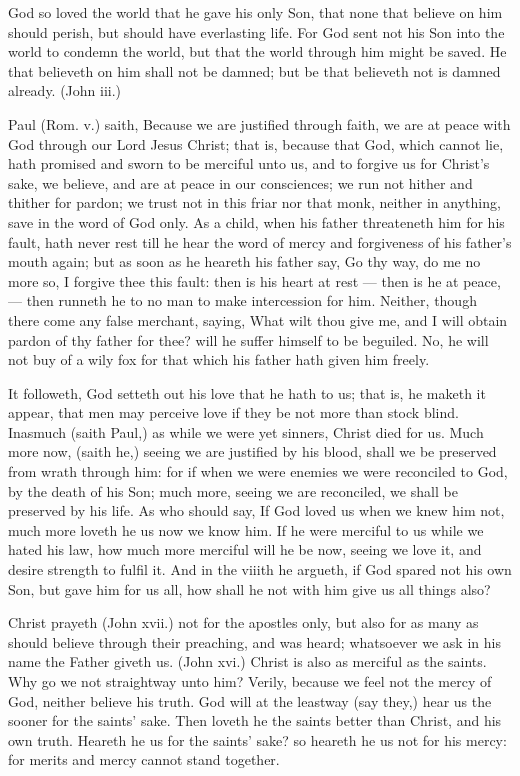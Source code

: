 God so loved the world that he gave his only Son, that 
none that believe on him should perish, but should have 
everlasting life. For God sent not his Son into the world 
to condemn the world, but that the world through him 
might be saved. He that believeth on him shall not be 
damned; but be that believeth not is damned already. 
(John iii.) 

Paul (Rom. v.) saith, Because we are justified through 
faith, we are at peace with God through our Lord Jesus 
Christ; that is, because that God, which cannot lie, hath 
promised and sworn to be merciful unto us, and to forgive
us for Christ's sake, we believe, and are at peace in 
our consciences; we run not hither and thither for pardon; 
we trust not in this friar nor that monk, neither in anything,
save in the word of God only. As a child, when 
his father threateneth him for his fault, hath never rest till 
he hear the word of mercy and forgiveness of his father's 
mouth again; but as soon as he heareth his father say, 
Go thy way, do me no more so, I forgive thee this fault: 
then is his heart at rest — then is he at peace, — then 
runneth he to no man to make intercession for him. 
Neither, though there come any false merchant, saying, 
What wilt thou give me, and I will obtain pardon of thy 
father for thee? will he suffer himself to be beguiled. 
No, he will not buy of a wily fox for that which his father 
hath given him freely. 

It followeth, God setteth out his love that he hath to us; 
that is, he maketh it appear, that men may perceive love if 
they be not more than stock blind. Inasmuch (saith 
Paul,) as while we were yet sinners, Christ died for us. 
Much more now, (saith he,) seeing we are justified by his 
blood, shall we be preserved from wrath through him: 
for if when we were enemies we were reconciled to God, 
by the death of his Son; much more, seeing we are reconciled,
we shall be preserved by his life. As who should 
say, If God loved us when we knew him not, much more 
loveth he us now we know him. If he were merciful to 
us while we hated his law, how much more merciful will 
he be now, seeing we love it, and desire strength to fulfil 
it. And in the viiith he argueth, if God spared not his 
own Son, but gave him for us all, how shall he not with 
him give us all things also? 

Christ prayeth (John xvii.) not for the apostles only, but 
also for as many as should believe through their preaching, 
and was heard; whatsoever we ask in his name the Father 
giveth us. (John xvi.) Christ is also as merciful as the 
saints. Why go we not straightway unto him? Verily, 
because we feel not the mercy of God, neither believe his 
truth. God will at the leastway (say they,) hear us the 
sooner for the saints' sake. Then loveth he the saints 
better than Christ, and his own truth. Heareth he us for 
the saints' sake? so heareth he us not for his mercy: for 
merits and mercy cannot stand together. 

